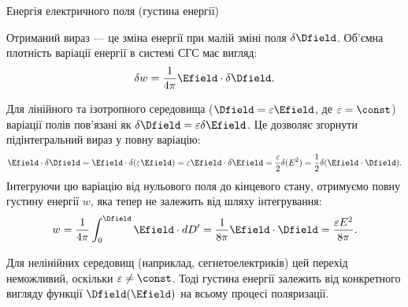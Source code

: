 \documentclass[onlytextwidth]{beamer}
\begin{document}
\begin{frame}{Енергія електричного поля (густина енергії)}{}\footnotesize
	\begin{block}{}\justifying
		Отриманий вираз --- це зміна енергії при малій зміні поля $\delta\Dfield$. Об'ємна плотність
		варіації енергії в системі СГС має вигляд:
		\begin{equation*}
			\delta w = \frac1{4\pi} \Efield\cdot \delta\Dfield.
		\end{equation*}
	\end{block}
	\begin{block}{}\justifying
		Для лінійного та ізотропного середовища ($\Dfield = \varepsilon\Efield$, де $\varepsilon = \const$)
		варіації полів пов'язані як $\delta\Dfield = \varepsilon\delta\Efield$. Це дозволяє згорнути підінтегральний вираз у повну варіацію:
		\begin{equation*}
			\Efield\cdot \delta \Dfield = \Efield\cdot \delta (\varepsilon \Efield) = \varepsilon \Efield\cdot \delta \Efield = \frac{\varepsilon }{2}\delta (E^{2}) = \frac{1}{2}\delta (\Efield\cdot \Dfield).
		\end{equation*}
		Інтегруючи цю варіацію від нульового поля до кінцевого стану, отримуємо повну густину енергії $w$, яка тепер не залежить від шляху інтегрування:
		\begin{equation*}
			w = \frac1{4\pi} \int_0^{\Dfield} \Efield\cdot dD' = \frac{1}{8\pi} \Efield\cdot\Dfield = \frac{\varepsilon E^2}{8\pi}.
		\end{equation*}
	\end{block}
	\begin{alertblock}{}\justifying
		Для нелінійних середовищ (наприклад, сегнетоелектриків) цей перехід неможливий, оскільки $\varepsilon \neq \const$.
		Тоді густина енергії залежить від конкретного вигляду функції $\Dfield(\Efield)$ на всьому процесі поляризації.
	\end{alertblock}
\end{frame}
\end{document}

